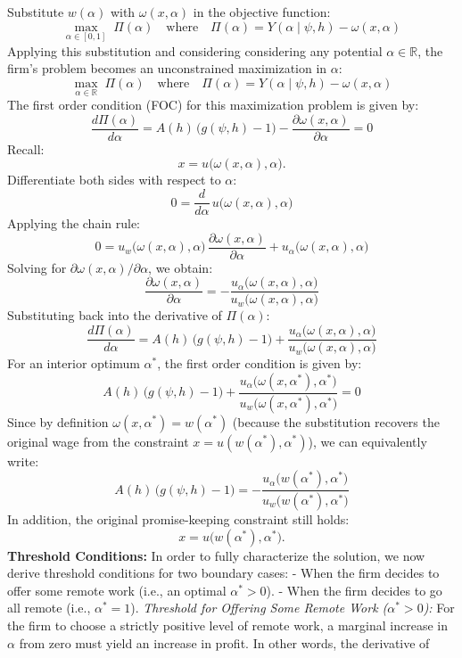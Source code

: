 \documentclass[
  11pt,
  letterpaper,
  DIV=11,
  numbers=noendperiod]{scrartcl}
\theoremstyle{plain}
\theoremstyle{remark}
\begin{document}
Substitute \(w(\alpha)\) with \(\omega(x,\alpha)\) in the objective
function: \[
\max_{\alpha \in [0,1]} \; \Pi(\alpha) \quad \text{where} \quad \Pi(\alpha) = Y(\alpha \mid \psi, h) - \omega(x, \alpha)
\] Applying this substitution and considering considering any potential
\(\alpha \in \mathbb{R}\), the firm's problem becomes an unconstrained
maximization in \(\alpha\): \[
\max_{\alpha \in \mathbb{R}} \; \Pi(\alpha) \quad \text{where} \quad \Pi(\alpha) = Y(\alpha \mid \psi, h) - \omega(x, \alpha)
\] The first order condition (FOC) for this maximization problem is
given by: \[
\frac{d\Pi(\alpha)}{d\alpha} = A(h)\,\big(g(\psi,h)-1\big) - \frac{\partial \omega(x,\alpha)}{\partial \alpha} = 0
\] Recall:\[
x = u\big(\omega(x,\alpha), \alpha\big).
\]Differentiate both sides with respect to \(\alpha\): \[
0 = \frac{d}{d\alpha}\, u\big(\omega(x,\alpha), \alpha\big)
\] Applying the chain rule:\[
0 = u_w\big(\omega(x,\alpha),\alpha\big) \, \frac{\partial \omega(x,\alpha)}{\partial \alpha} + u_\alpha\big(\omega(x,\alpha),\alpha\big)
\] Solving for \(\partial \omega(x,\alpha)/\partial \alpha\), we
obtain:\[
\frac{\partial \omega(x,\alpha)}{\partial \alpha} = -\frac{u_\alpha\big(\omega(x,\alpha),\alpha\big)}{u_w\big(\omega(x,\alpha),\alpha\big)}
\]Substituting back into the derivative of \(\Pi(\alpha)\):\[
\frac{d\Pi(\alpha)}{d\alpha} = A(h)\,\big(g(\psi,h)-1\big) + \frac{u_\alpha\big(\omega(x,\alpha),\alpha\big)}{u_w\big(\omega(x,\alpha),\alpha\big)}
\] For an interior optimum \(\alpha^*\), the first order condition is
given by:\[
A(h)\,\big(g(\psi,h)-1\big) + \frac{u_\alpha\big(\omega(x,\alpha^*),\alpha^*\big)}{u_w\big(\omega(x,\alpha^*),\alpha^*\big)} = 0\]Since
by definition \(\omega(x,\alpha^*) = w(\alpha^*)\) (because the
substitution recovers the original wage from the constraint
\(x = u(w(\alpha^*),\alpha^*)\)), we can equivalently
write:\[A(h)\,\big(g(\psi,h)-1\big) = -\frac{u_\alpha\big(w(\alpha^*),\alpha^*\big)}{u_w\big(w(\alpha^*),\alpha^*\big)}\]In
addition, the original promise-keeping constraint still holds:\[
x = u\big(w(\alpha^*),\alpha^*\big).\]\textbf{Threshold Conditions:} In
order to fully characterize the solution, we now derive threshold
conditions for two boundary cases: - When the firm decides to offer some
remote work (i.e., an optimal \(\alpha^*>0\)). - When the firm decides
to go all remote (i.e., \(\alpha^*=1\)). \emph{Threshold for Offering
Some Remote Work (\(\alpha^*>0\)):} For the firm to choose a strictly
positive level of remote work, a marginal increase in \(\alpha\) from
zero must yield an increase in profit. In other words, the derivative of
\end{document}
